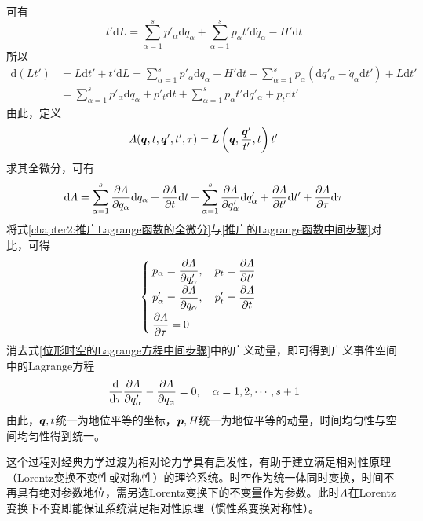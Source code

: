 可有
\begin{equation*}
	t'\mathrm{d} L = \sum_{\alpha=1}^s p'_\alpha \mathrm{d} q_\alpha + \sum_{\alpha=1}^s p_\alpha t' \mathrm{d} \dot{q}_\alpha - H' \mathrm{d} t
\end{equation*}
所以
\begin{align}
	\mathrm{d} (Lt') & = L\mathrm{d} t' + t'\mathrm{d} L = \sum_{\alpha=1}^s p'_\alpha \mathrm{d} q_\alpha - H' \mathrm{d} t + \sum_{\alpha=1}^s p_\alpha (\mathrm{d} q'_\alpha - \dot{q}_\alpha \mathrm{d} t') + L\mathrm{d} t' \nonumber \\
	& = \sum_{\alpha=1}^s p'_\alpha \mathrm{d} q_\alpha + p'_t \mathrm{d} t + \sum_{\alpha=1}^s p_\alpha t' \mathrm{d} q'_\alpha + p_t\mathrm{d} t'
	\label{推广的Lagrange函数中间步骤}
\end{align}
由此，定义
\begin{equation}
	\mathnormal{\Lambda}(\boldsymbol{q},t,\boldsymbol{q}',t',\tau) = L \left(\boldsymbol{q},\frac{\boldsymbol{q}'}{t'},t\right) t'
\end{equation}
求其全微分，可有
\begin{equation}
	\mathrm{d} \mathnormal{\Lambda} = \sum_{\alpha=1}^s \frac{\partial \mathnormal{\Lambda}}{\partial q_\alpha} \mathrm{d} q_\alpha + \frac{\partial \mathnormal{\Lambda}}{\partial t} \mathrm{d} t + \sum_{\alpha=1}^s \frac{\partial \mathnormal{\Lambda}}{\partial q'_\alpha} \mathrm{d} q'_\alpha + \frac{\partial \mathnormal{\Lambda}}{\partial t'} \mathrm{d} t' + \frac{\partial \mathnormal{\Lambda}}{\partial \tau} \mathrm{d} \tau
	\label{chapter2:推广Lagrange函数的全微分}
\end{equation}
将式\eqref{chapter2:推广Lagrange函数的全微分}与\eqref{推广的Lagrange函数中间步骤}对比，可得
\begin{equation}
	\begin{cases}
		\displaystyle p_\alpha = \frac{\partial \mathnormal{\Lambda}}{\partial q'_\alpha},\quad p_t = \frac{\partial \mathnormal{\Lambda}}{\partial t'} \\[1.5ex]
		\displaystyle p'_\alpha = \frac{\partial \mathnormal{\Lambda}}{\partial q_\alpha},\quad p'_t = \frac{\partial \mathnormal{\Lambda}}{\partial t} \\[1.5ex]
		\displaystyle \frac{\partial \mathnormal{\Lambda}}{\partial \tau} = 0
	\end{cases}
	\label{位形时空的Lagrange方程中间步骤}
\end{equation}
消去式\eqref{位形时空的Lagrange方程中间步骤}中的广义动量，即可得到{\heiti 广义事件空间中的Lagrange方程}
\begin{equation}
	\frac{\mathrm{d}}{\mathrm{d} \tau} \frac{\partial \mathnormal{\Lambda}}{\partial q'_\alpha} - \frac{\partial \mathnormal{\Lambda}}{\partial q_\alpha} = 0,\quad \alpha = 1,2,\cdots,s+1
	\label{位形时空的Lagrange方程}
\end{equation}
由此，$\boldsymbol{q},t$统一为地位平等的坐标，$\boldsymbol{p},H$统一为地位平等的动量，时间均匀性与空间均匀性得到统一。

这个过程对经典力学过渡为相对论力学具有启发性，有助于建立满足相对性原理（Lorentz变换不变性或对称性）的理论系统。时空作为统一体同时变换，时间不再具有绝对参数地位，需另选Lorentz变换下的不变量作为参数。此时$\mathnormal{\Lambda}$在Lorentz变换下不变即能保证系统满足相对性原理（惯性系变换对称性）。

